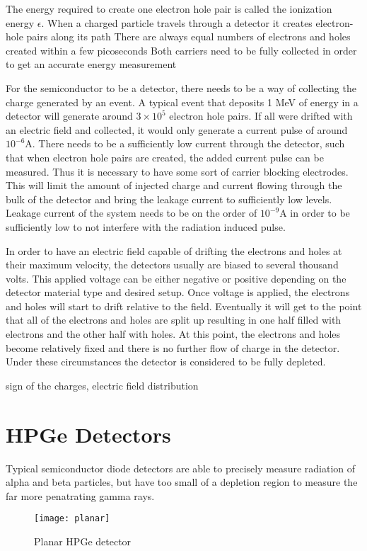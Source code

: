 The energy required to create one electron hole pair is called the ionization energy $\epsilon$.
When a charged particle travels through a detector it creates electron-hole pairs along its path
There are always equal numbers of electrons and holes created within a few picoseconds
Both carriers need to be fully collected in order to get an accurate energy measurement

For the semiconductor to be a detector, there needs to be a way of collecting the charge generated by an event.
A typical event that deposits 1 MeV of energy in a detector will generate around $3\times 10^{5}$ electron hole pairs.
If all were drifted with an electric field and collected, it would only generate a current pulse of around $10^{-6}$A.
There needs to be a sufficiently low current through the detector, such that when electron hole pairs are created, the added current pulse can be measured.
Thus it is necessary to have some sort of carrier blocking electrodes.
This will limit the amount of injected charge and current flowing through the bulk of the detector and bring the leakage current to sufficiently low levels.
Leakage current of the system needs to be on the order of $10^{-9}$A in order to be sufficiently low to not interfere with the radiation induced pulse.

In order to have an electric field capable of drifting the electrons and holes at their maximum velocity, the detectors usually are biased to several thousand volts.
This applied voltage can be either negative or positive depending on the detector material type and desired setup.
Once voltage is applied, the electrons and holes will start to drift relative to the field.
Eventually it will get to the point that all of the electrons and holes are split up resulting in one half filled with electrons and the other half with holes.
At this point, the electrons and holes become relatively fixed and there is no further flow of charge in the detector.
Under these circumstances the detector is considered to be fully depleted.

sign of the charges,
electric field distribution

\section {HPGe Detectors}
Typical semiconductor diode detectors are able to precisely measure radiation of alpha and beta particles, but have too small of a depletion region to measure the far more penatrating gamma rays.

\begin{figure}[htpb]
\centering
\texttt{[image: planar]}
\caption{Planar HPGe detector}
\label{fig:planar}
\end{figure}
